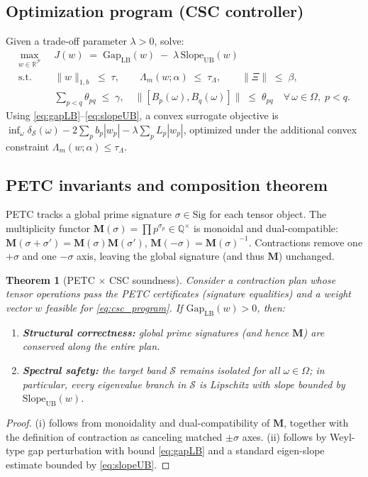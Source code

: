 \documentclass[11pt]{article}
\theoremstyle{plain}
\newtheorem{theorem}{Theorem}[section]
\theoremstyle{definition}
\newcommand{\Q}{\mathbb{Q}}
\newcommand{\Sig}{\mathrm{Sig}}
\newcommand{\M}{\mathbf{M}} %
\begin{document}
\subsection{Optimization program (CSC controller)}\label{subsec:csc_program}
Given a trade-off parameter $\lambda>0$, solve:
\begin{equation}\label{eq:csc_program}
\begin{aligned}
  \max_{w\in\mathbb R^{\mathcal P}}\;\; & J(w)\;=\; \mathrm{Gap}_{\mathrm{LB}}(w)\;-\;\lambda\,\mathrm{Slope}_{\mathrm{UB}}(w) \\
  \text{s.t.}\;\; & \|w\|_{1,b}\;\le\;\tau,\qquad \Lambda_m(w;\alpha)\;\le\;\tau_\Lambda,\qquad \|\Xi\|\;\le\;\beta,\\
                  & \sum_{p<q}\theta_{pq}\;\le\;\gamma,\quad \|[B_p(\omega),B_q(\omega)]\|\;\le\;\theta_{pq}\quad \forall\,\omega\in\Omega,\;p<q.
\end{aligned}
\end{equation}
Using \eqref{eq:gapLB}--\eqref{eq:slopeUB}, a convex surrogate objective is
$\inf_{\omega}\delta_{\mathcal S}(\omega)-2\sum_p b_p|w_p| - \lambda\sum_p L_p|w_p|$,
optimized under the additional convex constraint $\Lambda_m(w;\alpha)\le\tau_\Lambda$.


\subsection{PETC invariants and composition theorem}
PETC tracks a global prime signature $\sigma\in\Sig$ for each tensor object. The multiplicity functor $\M(\sigma)=\prod p^{\sigma_p}\in\Q^{\times}$ is monoidal and dual-compatible: $\M(\sigma+\sigma')=\M(\sigma)\M(\sigma')$, $\M(-\sigma)=\M(\sigma)^{-1}$. Contractions remove one $+\sigma$ and one $-\sigma$ axis, leaving the global signature (and thus $\M$) unchanged.

\begin{theorem}[PETC $\times$ CSC soundness]\label{thm:petc_csc_soundness}
Consider a contraction plan whose tensor operations pass the PETC certificates (signature equalities) and a weight vector $w$ feasible for \eqref{eq:csc_program}. If $\mathrm{Gap}_{\mathrm{LB}}(w)>0$, then:
\begin{enumerate}[label=(\roman*), leftmargin=*]
  \item \textbf{Structural correctness:} global prime signatures (and hence $\M$) are conserved along the entire plan.
  \item \textbf{Spectral safety:} the target band $\mathcal S$ remains isolated for all $\omega\in\Omega$; in particular, every eigenvalue branch in $\mathcal S$ is Lipschitz with slope bounded by $\mathrm{Slope}_{\mathrm{UB}}(w)$.
\end{enumerate}
\end{theorem}
\begin{proof}
(i) follows from monoidality and dual-compatibility of $\M$, together with the definition of contraction as canceling matched $\pm\sigma$ axes. (ii) follows by Weyl-type gap perturbation with bound \eqref{eq:gapLB} and a standard eigen-slope estimate bounded by \eqref{eq:slopeUB}.
\end{proof}
\end{document}
